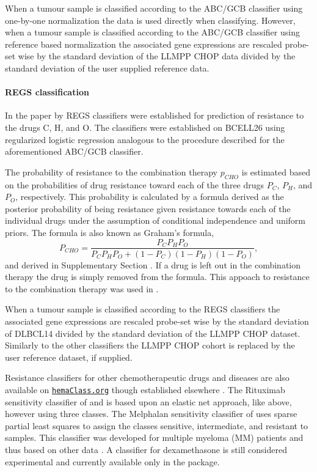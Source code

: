 \documentclass[10pt,letterpaper]{article}
\newcommand{\hemaClass}{\href{http://hemaClass.org}{\texttt{hemaClass.org}}}
\begin{document}
When a tumour sample is classified according to the ABC/GCB classifier using one-by-one normalization the data is used directly when classifying. However, when a tumour sample is classified according to the ABC/GCB classifier using reference based normalization the associated gene expressions are rescaled probe-set wise by the standard deviation of the LLMPP CHOP data divided by the standard deviation of the user supplied reference data.

\paragraph{REGS classification}
\label{sec:regsmethods}
In the paper by \cite{Falgreen2015} REGS classifiers were established for prediction of resistance to the drugs C, H, and O.
The classifiers were established on BCELL26 using regularized logistic regression analogous to the procedure described for the aforementioned ABC/GCB classifier.

The probability of resistance to the combination therapy $p_{CHO}$ is estimated based on the probabilities of drug resistance toward each of the three drugs $P_C$, $P_H$, and $P_O$, respectively.
This probability is calculated by a formula derived as the posterior probability of being resistance given resistance towards each of the individual drugs under the assumption of conditional independence and uniform priors.
The formula is also known as Graham's formula,
\begin{equation*}
  P_{CHO} = \frac{P_C P_H P_O}{P_C P_H P_O + (1 - P_C)(1 - P_H)(1 - P_O)},
\end{equation*}
and derived in Supplementary Section .
If a drug is left out in the combination therapy the drug is simply removed from the formula.
This appoach to resistance to the combination therapy was used in \cite{Falgreen2015}.

When a tumour sample is classified according to the REGS classifiers the associated gene expressions are rescaled probe-set wise by the standard deviation of DLBCL14 divided by the standard deviation of the LLMPP CHOP dataset.
Similarly to the other classifiers the LLMPP CHOP cohort is replaced by the user reference dataset, if supplied.

Resistance classifiers for other chemotherapeutic drugs and diseases are also available on \hemaClass{} though established elsewhere \cite{Boegsted2011,Bogsted2013,Laursen2014}.
The Rituximab sensitivity classifier of \cite{Laursen2014} and \cite{Laursen2015} is based upon an elastic net approach, like above, however using three classes.
The Melphalan sensitivity classifier of \cite{Boegsted2011} uses sparse partial least squares to assign the classes sensitive, intermediate, and resistant to samples.
This classifier was developed for multiple myeloma (MM) patients and thus based on other data \cite{Boegsted2011}.
A classifier for dexamethasone is still considered experimental and currently available only in the package.
\end{document}
